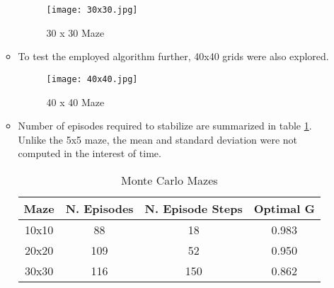 \documentclass[letterpaper]{article} %
\begin{document}
\begin{enumerate}
\begin{itemize}
	    \begin{figure}[htbp]
	      \centering
	      \texttt{[image: 30x30.jpg]}
		\caption{30 x 30 Maze}
	      \label{fig:30x30_solution}
	    \end{figure}

	    \item To test the employed algorithm further, 40x40 grids were also explored. 

	    \begin{figure}[htbp]
	      \centering
	      \texttt{[image: 40x40.jpg]}
		\caption{40 x 40 Maze}
	      \label{fig:40x40_solution}
	    \end{figure}



	\item Number of episodes required to stabilize are summarized in table \ref{tab:num_episodes}. Unlike the 5x5 maze, the mean and standard deviation were not computed in the interest of time.

	    \begin{table}[htbp]
	    \caption{Monte Carlo Mazes}
	    \label{tab:num_episodes}
	    \centering
	    \begin{tabular}{|c|c|c|c|}
	    \hline
		Maze    &  N. Episodes & N. Episode Steps & Optimal G       \\ \hline
		10x10   & 88        & 18                  & 0.983   \\ \hline
		20x20   & 109       & 52                  & 0.950   \\ \hline
		30x30   & 116       & 150                 & 0.862   \\ \hline
	    \end{tabular}
	    \end{table}
	\end{itemize}

    \end{enumerate}





\end{document}
